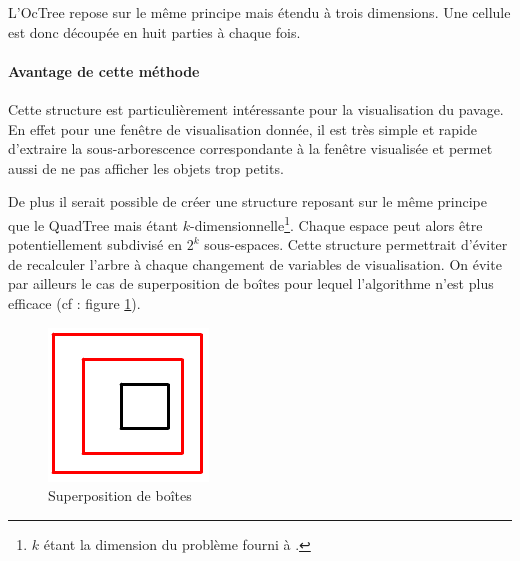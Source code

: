 L'OcTree repose sur le même principe mais étendu à trois dimensions. Une cellule est donc découpée en huit parties à chaque fois.

\paragraph{Avantage de cette méthode}Cette structure est particulièrement intéressante pour la visualisation du pavage. En effet pour une fenêtre de visualisation donnée, il est très simple et rapide d'extraire la sous-arborescence correspondante à la fenêtre visualisée et permet aussi de ne pas afficher les objets trop petits. 

De plus il serait possible de créer une structure reposant sur le même principe que le QuadTree mais étant $k$-dimensionnelle\footnote{$k$ étant la dimension du problème fourni à \realpaver.}. Chaque espace peut alors être potentiellement subdivisé en $2^k$ sous-espaces. Cette structure permettrait d'éviter de recalculer l'arbre à chaque changement de variables de visualisation. On évite par ailleurs le cas de superposition de boîtes pour lequel l'algorithme n'est plus efficace (cf : figure \ref{fig:superpos}).
\begin{figure}[htbp]
\centering
\includegraphics[scale=0.30]{img/QT8}
\caption{Superposition de boîtes}
\label{fig:superpos}
\end{figure}

